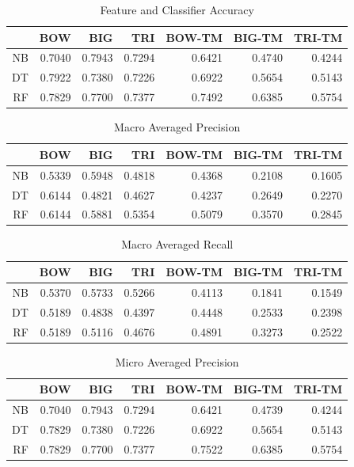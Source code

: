 \documentclass[11pt]{article}
\begin{document}
\begin{table}[htbp]
  \centering
  \caption{Feature and Classifier Accuracy}
    \begin{tabular}{r|rrrrrr}
    \toprule
          & BOW   & BIG   & TRI   & BOW-TM & BIG-TM & TRI-TM \\
    \midrule
    NB    & 0.7040 & 0.7943 & 0.7294 & 0.6421 & 0.4740 & 0.4244 \\
    DT    & 0.7922 & 0.7380 & 0.7226 & 0.6922 & 0.5654 & 0.5143 \\
    RF    & 0.7829 & 0.7700 & 0.7377 & 0.7492 & 0.6385 & 0.5754 \\
    \bottomrule
    \end{tabular}%
  \label{tab:acc}%
\end{table}%

\begin{table}[htbp]
  \centering
  \caption{Macro Averaged Precision}
    \begin{tabular}{r|rrrrrr}
    \toprule
          & BOW   & BIG   & TRI   & BOW-TM & BIG-TM & TRI-TM \\
    \midrule
    NB    & 0.5339 & 0.5948 & 0.4818 & 0.4368 & 0.2108 & 0.1605 \\
    DT    & 0.6144 & 0.4821 & 0.4627 & 0.4237 & 0.2649 & 0.2270 \\
    RF    & 0.6144 & 0.5881 & 0.5354 & 0.5079 & 0.3570 & 0.2845 \\
    \bottomrule
    \end{tabular}%
  \label{tab:map}%
\end{table}%

\begin{table}[htbp]
  \centering
  \caption{Macro Averaged Recall}
    \begin{tabular}{r|rrrrrr}
    \toprule
          & BOW   & BIG   & TRI   & BOW-TM & BIG-TM & TRI-TM \\
    \midrule
    NB    & 0.5370 & 0.5733 & 0.5266 & 0.4113 & 0.1841 & 0.1549 \\
    DT    & 0.5189 & 0.4838 & 0.4397 & 0.4448 & 0.2533 & 0.2398 \\
    RF    & 0.5189 & 0.5116 & 0.4676 & 0.4891 & 0.3273 & 0.2522 \\
    \bottomrule
    \end{tabular}%
  \label{tab:mar}%
\end{table}%

\begin{table}[htbp]
  \centering
  \caption{Micro Averaged Precision}
    \begin{tabular}{r|rrrrrr}
    \toprule
          & BOW   & BIG   & TRI   & BOW-TM & BIG-TM & TRI-TM \\
    \midrule
    NB    & 0.7040 & 0.7943 & 0.7294 & 0.6421 & 0.4739 & 0.4244 \\
    DT    & 0.7829 & 0.7380 & 0.7226 & 0.6922 & 0.5654 & 0.5143 \\
    RF    & 0.7829 & 0.7700 & 0.7377 & 0.7522 & 0.6385 & 0.5754 \\
    \bottomrule
    \end{tabular}%
  \label{tab:mip}%
\end{table}%
\end{document}
